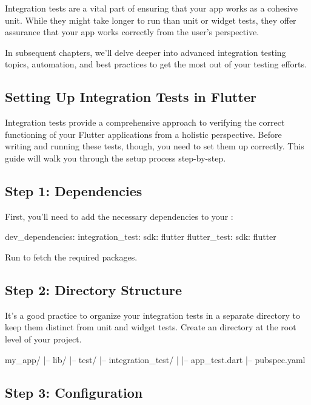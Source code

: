 Integration tests are a vital part of ensuring that your app works as a cohesive unit. 
While they might take longer to run than unit or widget tests, they offer assurance that your app works correctly from the user's perspective.

In subsequent chapters, we'll delve deeper into advanced integration testing topics, automation, and best practices to get the most out of your testing efforts.


\subsection{Setting Up Integration Tests in Flutter}

Integration tests provide a comprehensive approach to verifying the correct functioning of your Flutter applications from a holistic perspective. Before writing and running these tests, though, you need to set them up correctly. 
This guide will walk you through the setup process step-by-step.

\subsection*{Step 1: Dependencies}

First, you'll need to add the necessary dependencies to your :

\begin{yamlcode}
dev_dependencies:
  integration_test:
    sdk: flutter
  flutter_test:
    sdk: flutter
\end{yamlcode}

Run  to fetch the required packages.

\subsection*{Step 2: Directory Structure}

It's a good practice to organize your integration tests in a separate directory to keep them distinct from unit and widget tests. Create an  directory at the root level of your project.

\begin{yamlcode}
my_app/
|-- lib/
|-- test/
|-- integration_test/
|   |-- app_test.dart
|-- pubspec.yaml
\end{yamlcode}

\subsection*{Step 3: Configuration}

